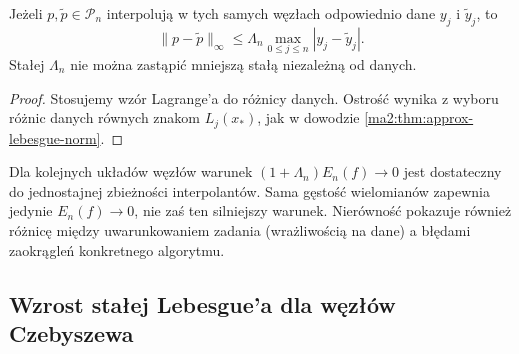 \begin{wniosek}
\label{ma2:cor:approx-data-error}
Jeżeli $p,\widetilde p\in\mathcal P_n$
interpolują w tych samych węzłach odpowiednio
dane $y_j$ i $\widetilde y_j$, to
\[
 \|p-\widetilde p\|_\infty
 \le\Lambda_n\max_{0\le j\le n}|y_j-\widetilde y_j|.
\]
Stałej $\Lambda_n$ nie można zastąpić mniejszą
stałą niezależną od danych.
\end{wniosek}
\begin{proof}
Stosujemy wzór Lagrange'a do różnicy danych.
Ostrość wynika z wyboru różnic danych
równych znakom $L_j(x_*)$, jak w dowodzie
\ref{ma2:thm:approx-lebesgue-norm}.
\end{proof}

Dla kolejnych układów węzłów warunek
$(1+\Lambda_n)E_n(f)\to0$ jest dostateczny
do jednostajnej zbieżności interpolantów.
Sama gęstość wielomianów zapewnia jedynie
$E_n(f)\to0$, nie zaś ten silniejszy warunek.
Nierówność pokazuje również różnicę między
uwarunkowaniem zadania (wrażliwością na dane)
a błędami zaokrągleń konkretnego algorytmu.


\subsection{Wzrost stałej Lebesgue'a dla węzłów Czebyszewa}

